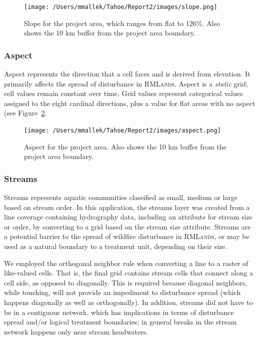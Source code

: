 \begin{figure}[htbp]
\centering
\texttt{[image: /Users/mmallek/Tahoe/Report2/images/slope.png]}
\caption{Slope for the project area, which ranges from flat to 126\%. Also shows the 10 km buffer from the project area boundary.} 
\label{slopemap}
\end{figure}

\subsubsection{Aspect} Aspect represents the direction that a cell faces and is derived from elevation. It primarily affects the spread of disturbance in \textsc{RMLands}. Aspect is a \emph{static} grid; cell values remain constant over time. Grid values represent categorical values assigned to the eight cardinal directions, plus a value for flat areas with no aspect (see Figure~\ref{aspectmap}. 

\begin{figure}[htbp]
\centering
\texttt{[image: /Users/mmallek/Tahoe/Report2/images/aspect.png]}
\caption{Aspect for the project area. Also shows the 10 km buffer from the project area boundary.} 
\label{aspectmap}
\end{figure}

\subsubsection{Streams} 
Streams represents aquatic communities classified as small, medium or large based on stream order. In this application, the streams layer was created from a line coverage containing hydrography data, including an attribute for stream size or order, by converting to a grid based on the stream size attribute. Streams are a potential barrier to the spread of wildfire disturbance in \textsc{RMLands}, or may be used as a natural boundary to a treatment unit, depending on their size.

We employed the orthogonal neighbor rule when converting a line to a raster of like-valued cells. That is, the final grid contains stream cells that connect along a cell side, as opposed to diagonally. This is required because diagonal neighbors, while touching, will not provide an impediment to disturbance spread (which happens diagonally as well as orthogonally). In addition, streams did not have to be in a contiguous network, which has implications in terms of disturbance spread and/or logical treatment boundaries; in general breaks in the stream network happens only near stream headwaters. 

